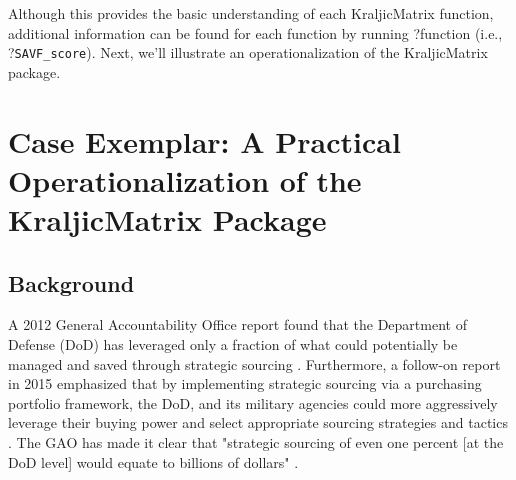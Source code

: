 \documentclass[twocolumn]{svjour3}       %
\begin{document}
Although this provides the basic understanding of each KraljicMatrix function, additional information can be found for each function by running ?function (i.e., ?\texttt{SAVF\_score}).  Next, we'll illustrate an operationalization of the KraljicMatrix package. 


\section{Case Exemplar: A Practical Operationalization of the KraljicMatrix Package}
\label{sec:5}


\subsection{Background}
\label{sec:5.1}

A 2012 General Accountability Office \citep{gao} report found that the Department of Defense (DoD) has leveraged only a fraction of what could potentially be managed and saved through strategic sourcing \citep{gao}.  Furthermore, a follow-on report in 2015 emphasized that by implementing strategic sourcing via a purchasing portfolio framework, the DoD, and its military agencies could more aggressively leverage their buying power and select appropriate sourcing strategies and tactics \citep{gao2}.  The GAO has made it clear that "strategic sourcing of even one percent [at the DoD level] would equate to billions of dollars" \citep{gao}.

\end{document}
